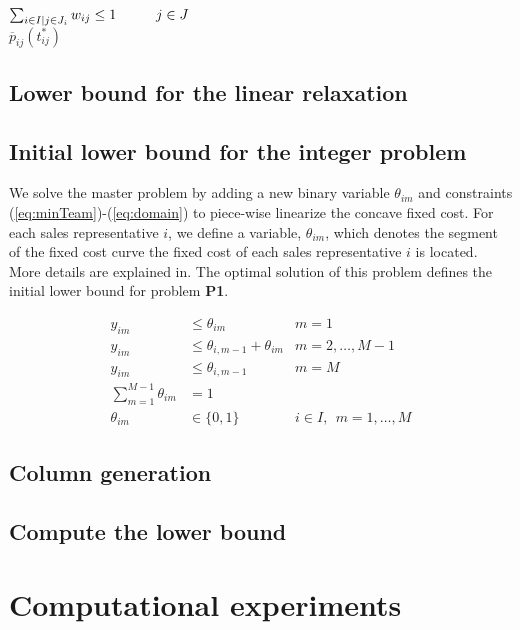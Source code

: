 \documentclass[12pt]{scrartcl}
\begin{document}
$\sum_{i \in I\mid j \in J_i} w_{ij}   \le 1 \hspace*{1cm} j \in J $ \\ [$\Rightarrow$] $\overline{p}_{ij}(t_{ij}^*)$

\subsection{Lower bound for the linear relaxation}


\subsection{Initial lower bound for the integer problem}

 We solve the master problem by adding a new binary variable $\theta_{im}$ and constraints (\ref{eq:minTeam})-(\ref{eq:domain}) to piece-wise linearize the concave fixed cost. For each sales representative $i$, we define a variable, $\theta_{im}$, which denotes the segment of the fixed cost curve the fixed cost of each sales representative $i$ is located. More details are explained in. The optimal solution of this problem defines the initial lower bound for problem \textbf{P1}.

\begin{align}
y_{im} &\leq \theta_{im} & m = 1 \label{eq:minTeam}  \\
y_{im} &\leq \theta_{i,m-1} + \theta_{im}  & m = 2,\dots,M-1 \label{eq:twoSegments1}\\
y_{im} &\leq \theta_{i,m-1} & m = M \label{eq:twoSegments2} \\
\sum_{m=1}^{M-1} \theta_{im} &= 1 & \label{eq:oneSegment} \\
\theta_{im} &\in \{0,1\} & i \in I, \ \ m = 1,\dots,M \label{eq:domain}
\end{align}

    
\subsection{Column generation}






\subsection{Compute the lower bound}

\section{Computational experiments}
\end{document}
